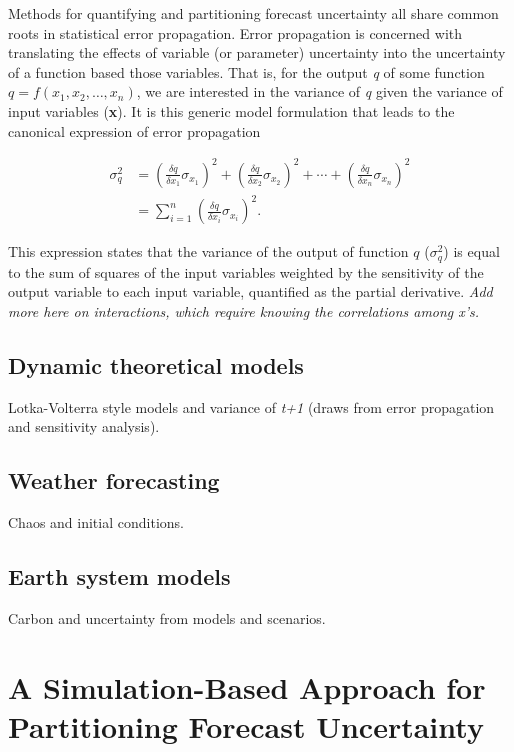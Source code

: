 \documentclass[12pt,]{article}
\begin{document}
Methods for quantifying and partitioning forecast uncertainty all share
common roots in statistical error propagation. Error propagation is
concerned with translating the effects of variable (or parameter)
uncertainty into the uncertainty of a function based those variables.
That is, for the output \emph{q} of some function
\(q = f(x_1,x_2,\dots,x_n)\), we are interested in the variance of
\emph{q} given the variance of input variables (\textbf{x}). It is this
generic model formulation that leads to the canonical expression of
error propagation

\begin{align}
\sigma^2_q &= \left( \frac{\delta q}{\delta x_1} \sigma_{x_1} \right)^2 + \left( \frac{\delta q}{\delta x_2} \sigma_{x_2} \right)^2 + \cdots + \left( \frac{\delta q}{\delta x_n} \sigma_{x_n} \right)^2 \\
&= \sum^n_{i=1}\left( \frac{\delta q}{\delta x_i} \sigma_{x_i} \right)^2.
\end{align}

\noindent{}This expression states that the variance of the output of
function \(q\) (\(\sigma^2_q\)) is equal to the sum of squares of the
input variables weighted by the sensitivity of the output variable to
each input variable, quantified as the partial derivative. \emph{Add
more here on interactions, which require knowing the correlations among
x's.}

\subsection{Dynamic theoretical
models}\label{dynamic-theoretical-models}

Lotka-Volterra style models and variance of \emph{t+1} (draws from error
propagation and sensitivity analysis).

\subsection{Weather forecasting}\label{weather-forecasting}

Chaos and initial conditions.

\subsection{Earth system models}\label{earth-system-models}

Carbon and uncertainty from models and scenarios.

\section{A Simulation-Based Approach for Partitioning Forecast
Uncertainty}\label{a-simulation-based-approach-for-partitioning-forecast-uncertainty}
\end{document}
